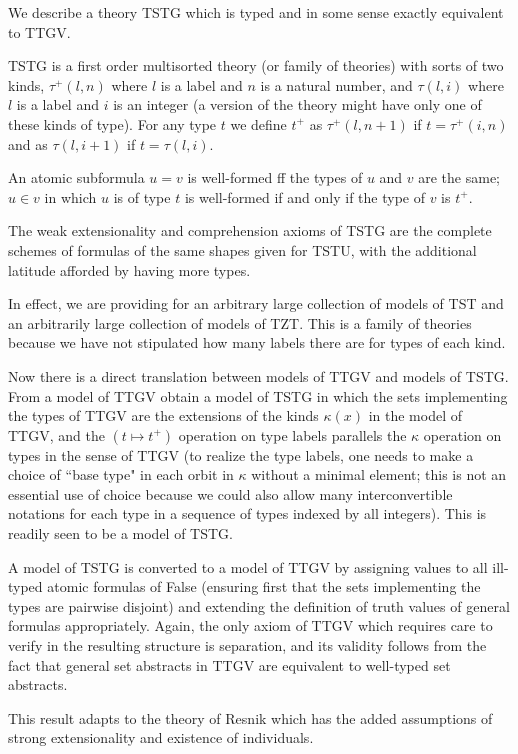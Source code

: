 \documentclass[12pt]{article}
\begin{document}
We describe a theory TSTG which is typed and in some sense exactly equivalent to TTGV.

TSTG is a first order multisorted theory (or family of theories) with sorts of two kinds, $\tau^+(l,n)$ where $l$ is a label and $n$ is a natural number, and $\tau(l,i)$ where $l$ is a label and $i$ is an integer (a version of the theory might have only one of these kinds of type).  For any type $t$ we define $t^+$ as $\tau^+(l,n+1)$ if $t=\tau^+(i,n)$ and as $\tau(l,i+1)$ if $t=\tau(l,i)$.  

An atomic subformula $u=v$ is well-formed ff the types of $u$ and $v$ are the same; $u \in v$ in which $u$ is of type $t$ is well-formed if and only if the type of $v$ is $t^+$.

The weak extensionality and comprehension axioms of TSTG are the complete schemes of formulas of the same shapes given for TSTU, with the additional latitude afforded by having more types.

In effect, we are providing for an arbitrary large collection of models of TST and an arbitrarily large collection of models of TZT.  This is a family of theories because we have not stipulated how many labels there are for types of each kind.

Now there is a direct translation between models of TTGV and models of TSTG.  From a model of TTGV obtain a model of TSTG in which the sets implementing the types of TTGV are the extensions of the kinds $\kappa(x)$ in the model of TTGV, and the $(t \mapsto t^+)$ operation on type labels parallels the $\kappa$ operation on types in the sense of TTGV (to realize the type labels, one needs to make a choice of ``base type" in each orbit in $\kappa$ without a minimal element;  this is not an essential use of choice because we could also allow many interconvertible notations for each type in a sequence of types indexed by all integers).  This is readily seen to be a model of TSTG.

A model of TSTG is converted to a model of TTGV by assigning values to all ill-typed atomic formulas of False
(ensuring first that the sets implementing the types are pairwise disjoint) and extending the definition of truth values of general formulas appropriately.  Again, the only axiom of TTGV which requires care to verify in the resulting structure is separation, and its validity follows from the fact
that general set abstracts in TTGV are equivalent to well-typed set abstracts.

This result adapts to the theory of Resnik which has the added assumptions of strong extensionality and existence of individuals.
\end{document}

